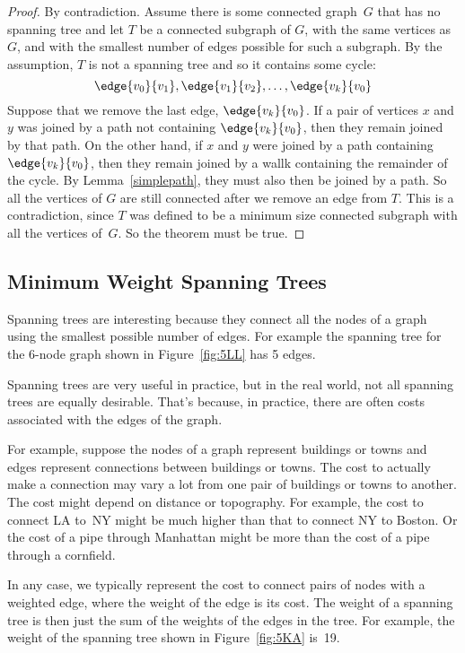 \begin{proof}
By contradiction.  Assume there is some connected graph~$G$ that has
no spanning tree and let $T$ be a connected subgraph of $G$, with the
same vertices as $G$, and with the smallest number of edges possible
for such a subgraph.  By the assumption, $T$ is not a spanning tree
and so it contains some cycle:
\[
\edge{v_0}{v_1}, \edge{v_1}{v_2}, \dots, \edge{v_k}{v_0}
\]
Suppose that we remove the last edge, $\edge{v_k}{v_0}$.  If a pair
of vertices $x$ and $y$ was joined by a path not containing
$\edge{v_k}{v_0}$, then they remain joined by that path.  On the
other hand, if $x$ and $y$ were joined by a path containing
$\edge{v_k}{v_0}$, then they remain joined by a wallk containing the
remainder of the cycle.  By Lemma~\ref{simplepath}, they must also
then be joined by a path.  So all the vertices of $G$ are still
connected after we remove an edge from $T$.  This is a contradiction,
since $T$ was defined to be a minimum size connected subgraph with
all the vertices of~$G$.  So the theorem must be true.
\end{proof}

\subsection{Minimum Weight Spanning Trees}

Spanning trees are interesting because they connect all the nodes of a
graph using the smallest possible number of edges.  For example the
spanning tree for the 6-node graph shown in Figure~\ref{fig:5LL} has 5
edges.

Spanning trees are very useful in practice, but in the real world, not
all spanning trees are equally desirable.  That's because, in
practice, there are often costs associated with the edges of the graph.

For example, suppose the nodes of a graph represent buildings or towns
and edges represent connections between buildings or towns.  The cost
to actually make a connection may vary a lot from one pair of
buildings or towns to another.  The cost might depend on distance or
topography.  For example, the cost to connect LA to~NY might be much
higher than that to connect NY to Boston.  Or the cost of a pipe
through Manhattan might be more than the cost of a pipe through a
cornfield.

In any case, we typically represent the cost to connect pairs of nodes
with a weighted edge, where the weight of the edge is its cost.  The
weight of a spanning tree is then just the sum of the weights of the
edges in the tree.  For example, the weight of the spanning tree shown
in Figure~\ref{fig:5KA} is~19.

